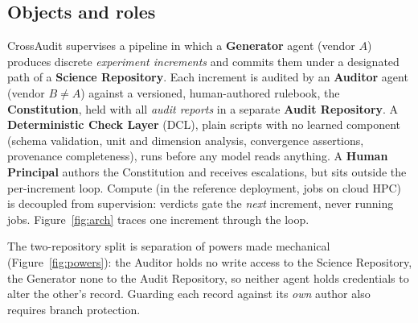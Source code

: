 \documentclass[11pt]{article}
\begin{document}
\subsection{Objects and roles}\label{sec:roles}

CrossAudit supervises a pipeline in which a \textbf{Generator} agent (vendor $A$) produces discrete \emph{experiment increments} and commits them under a designated path of a \textbf{Science Repository}. Each increment is audited by an \textbf{Auditor} agent (vendor $B \neq A$) against a versioned, human-authored rulebook, the \textbf{Constitution}, held with all \emph{audit reports} in a separate \textbf{Audit Repository}. A \textbf{Deterministic Check Layer} (DCL), plain scripts with no learned component (schema validation, unit and dimension analysis, convergence assertions, provenance completeness), runs before any model reads anything. A \textbf{Human Principal} authors the Constitution and receives escalations, but sits outside the per-increment loop. Compute (in the reference deployment, jobs on cloud HPC) is decoupled from supervision: verdicts gate the \emph{next} increment, never running jobs. Figure~\ref{fig:arch} traces one increment through the loop.

The two-repository split is separation of powers made mechanical (Figure~\ref{fig:powers}): the Auditor holds no write access to the Science Repository, the Generator none to the Audit Repository, so neither agent holds credentials to alter the other's record. Guarding each record against its \emph{own} author also requires branch protection.
\end{document}
